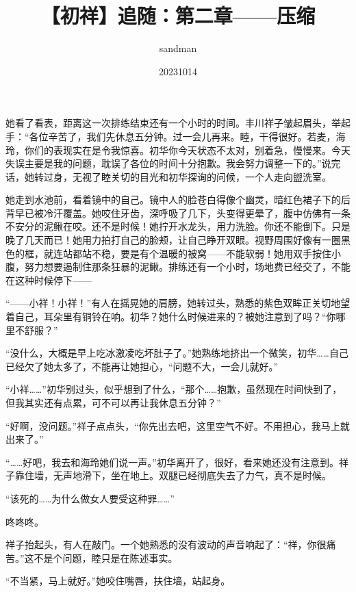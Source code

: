 \documentclass{article}
\title{【初祥】追随：第二章——压缩}
\author{sandman}
\date{20231014}
\begin{document}



\Large

她看了看表，距离这一次排练结束还有一个小时的时间。丰川祥子皱起眉头，举起手：“各位辛苦了，我们先休息五分钟。过一会儿再来。睦，干得很好。若麦，海玲，你们的表现实在是令我惊喜。初华你今天状态不太对，别着急，慢慢来。今天失误主要是我的问题，耽误了各位的时间十分抱歉。我会努力调整一下的。”说完话，她转过身，无视了睦关切的目光和初华探询的问候，一个人走向盥洗室。



她走到水池前，看着镜中的自己。镜中人的脸苍白得像个幽灵，暗红色裙子下的后背早已被冷汗覆盖。她咬住牙齿，深呼吸了几下，头变得更晕了，腹中仿佛有一条不安分的泥鳅在咬。还不是时候！她拧开水龙头，用力洗脸。你还不能倒下。只是晚了几天而已！她用力拍打自己的脸颊，让自己睁开双眼。视野周围好像有一圈黑色的框，就连站都站不稳，要是有个温暖的被窝——不能软弱！她用双手按住小腹，努力想要遏制住那条狂暴的泥鳅。排练还有一个小时，场地费已经交了，不能在这种时候停下——



“——小祥！小祥！”有人在摇晃她的肩膀，她转过头，熟悉的紫色双眸正关切地望着自己，耳朵里有铜铃在响。初华？她什么时候进来的？被她注意到了吗？“你哪里不舒服？”



“没什么，大概是早上吃冰激凌吃坏肚子了。”她熟练地挤出一个微笑，初华……自己已经欠了她太多了，不能再让她担心，“问题不大，一会儿就好。”



“小祥……”初华别过头，似乎想到了什么，“那个……抱歉，虽然现在时间快到了，但我其实还有点累，可不可以再让我休息五分钟？”



“好啊，没问题。”祥子点点头，“你先出去吧，这里空气不好。不用担心，我马上就出来了。”



“……好吧，我去和海玲她们说一声。”初华离开了，很好，看来她还没有注意到。祥子靠住墙，无声地滑下，坐在地上。双腿已经彻底失去了力气，真不是时候。



“该死的……为什么做女人要受这种罪……”



咚咚咚。



祥子抬起头，有人在敲门。一个她熟悉的没有波动的声音响起了：“祥，你很痛苦。”这不是个问题，睦只是在陈述事实。



“不当紧，马上就好。”她咬住嘴唇，扶住墙，站起身。
\end{document}
